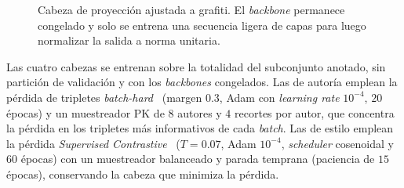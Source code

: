 \begin{figure}[h!]
  \centering
  \shorthandoff{<>}%
  \shorthandon{<>}%
  \caption[Cabeza de proyección ajustada a grafiti]{Cabeza de proyección ajustada a grafiti. El \textit{backbone} permanece
    congelado y solo se entrena una secuencia ligera de capas para luego normalizar
    la salida a norma unitaria.}
  \label{fig:cabeza-proyeccion}
\end{figure}

Las cuatro cabezas se entrenan sobre la totalidad del subconjunto anotado, sin
partición de validación y con los \textit{backbones} congelados. Las de autoría
emplean la pérdida de tripletes \textit{batch-hard}~\cite{hermans_defense_2017}
(margen $0.3$, Adam con \textit{learning rate} $10^{-4}$, $20$ épocas) y un
muestreador PK de $8$ autores y $4$ recortes por autor, que concentra la pérdida
en los tripletes más informativos de cada \textit{batch}. Las de estilo emplean
la pérdida \textit{Supervised Contrastive}~\cite{khosla_supervised_2021}
($T=0.07$, Adam $10^{-4}$, \textit{scheduler} cosenoidal y $60$ épocas) con un
muestreador balanceado y parada temprana (paciencia de $15$ épocas), conservando
la cabeza que minimiza la pérdida.
